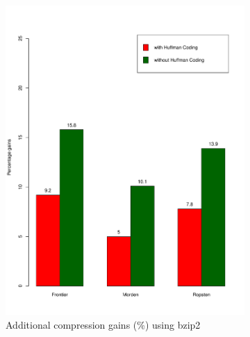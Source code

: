 \begin{figure}[H]
\begin{subfigure}{0.45\textwidth}
	\includegraphics[width=\textwidth]{plots/bzip2-vanilla}
	\caption{Additional compression gains (\%) using bzip2}
	\label{fig:bzip2}
\end{subfigure}
\begin{subfigure}{0.45\textwidth}

\end{subfigure}
\end{figure}
